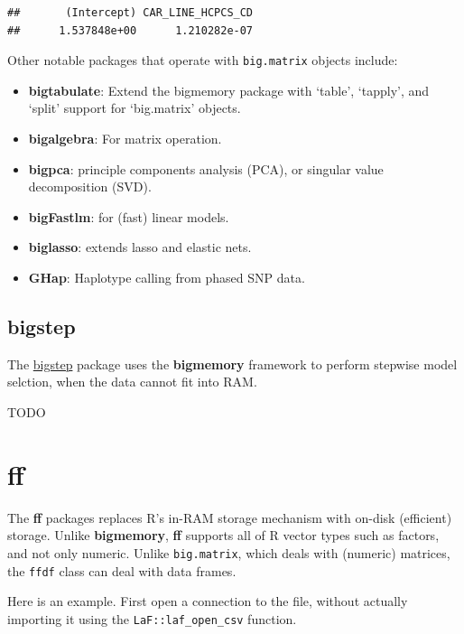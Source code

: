 \documentclass[]{book}
\providecommand{\tightlist}{%
  \setlength{\itemsep}{0pt}\setlength{\parskip}{0pt}}
\theoremstyle{definition}
\theoremstyle{definition}
\theoremstyle{definition}
\theoremstyle{remark}
\begin{document}
\begin{verbatim}
##       (Intercept) CAR_LINE_HCPCS_CD 
##      1.537848e+00      1.210282e-07
\end{verbatim}

Other notable packages that operate with \texttt{big.matrix} objects
include:

\begin{itemize}
\tightlist
\item
  \textbf{bigtabulate}: Extend the bigmemory package with `table',
  `tapply', and `split' support for `big.matrix' objects.
\item
  \textbf{bigalgebra}: For matrix operation.
\item
  \textbf{bigpca}: principle components analysis (PCA), or singular
  value decomposition (SVD).
\item
  \textbf{bigFastlm}: for (fast) linear models.
\item
  \textbf{biglasso}: extends lasso and elastic nets.
\item
  \textbf{GHap}: Haplotype calling from phased SNP data.
\end{itemize}

\subsection{bigstep}\label{bigstep}

The
\href{https://cran.r-project.org/web/packages/bigstep/vignettes/bigstep.html}{bigstep}
package uses the \textbf{bigmemory} framework to perform stepwise model
selction, when the data cannot fit into RAM.

TODO

\section{ff}\label{ff}

The \textbf{ff} packages replaces R's in-RAM storage mechanism with
on-disk (efficient) storage. Unlike \textbf{bigmemory}, \textbf{ff}
supports all of R vector types such as factors, and not only numeric.
Unlike \texttt{big.matrix}, which deals with (numeric) matrices, the
\texttt{ffdf} class can deal with data frames.

Here is an example. First open a connection to the file, without
actually importing it using the \texttt{LaF::laf\_open\_csv} function.
\end{document}
